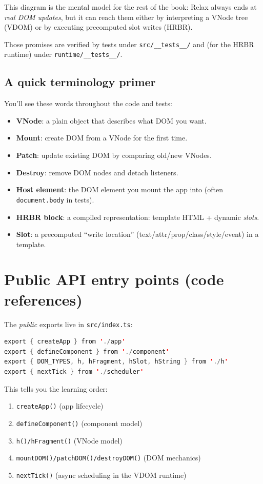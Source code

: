 This diagram is the mental model for the rest of the book: Relax always ends at \emph{real DOM updates}, but it can reach them either by interpreting a VNode tree (VDOM) or by executing precomputed slot writes (HRBR).

Those promises are verified by tests under \texttt{src/\_\_tests\_\_/} and (for the HRBR runtime) under \texttt{runtime/\_\_tests\_\_/}.

\subsection{A quick terminology primer}
You'll see these words throughout the code and tests:

\begin{itemize}
  \item \textbf{VNode}: a plain object that describes what DOM you want.
  \item \textbf{Mount}: create DOM from a VNode for the first time.
  \item \textbf{Patch}: update existing DOM by comparing old/new VNodes.
  \item \textbf{Destroy}: remove DOM nodes and detach listeners.
  \item \textbf{Host element}: the DOM element you mount the app into (often \texttt{document.body} in tests).
  \item \textbf{HRBR block}: a compiled representation: template HTML + dynamic \emph{slots}.
  \item \textbf{Slot}: a precomputed ``write location'' (text/attr/prop/class/style/event) in a template.
\end{itemize}

\section{Public API entry points (code references)}
The \emph{public} exports live in \texttt{src/index.ts}:

\begin{lstlisting}[style=relax,language=Java]
export { createApp } from './app'
export { defineComponent } from './component'
export { DOM_TYPES, h, hFragment, hSlot, hString } from './h'
export { nextTick } from './scheduler'
\end{lstlisting}

This tells you the learning order:

\begin{enumerate}
  \item \texttt{createApp()} (app lifecycle)
  \item \texttt{defineComponent()} (component model)
  \item \texttt{h()/hFragment()} (VNode model)
  \item \texttt{mountDOM()/patchDOM()/destroyDOM()} (DOM mechanics)
  \item \texttt{nextTick()} (async scheduling in the VDOM runtime)
\end{enumerate}

